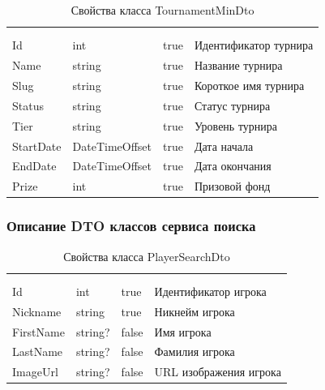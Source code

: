\begin{xltabular}{\textwidth}{|X|X|X|X|}
	\caption{Свойства класса TournamentMinDto}\label{table:TournamentMinDto}\\ \hline
	 &  &  &  \\ \hline
	 &  &  &  \\ \hline
	\endfirsthead
	 \hline
	 &  &  &  \\ \hline
	\endhead
	Id & int & true & Идентификатор турнира \\ \hline
	Name & string & true & Название турнира \\ \hline
	Slug & string & true & Короткое имя турнира \\ \hline
	Status & string & true & Статус турнира \\ \hline
	Tier & string & true & Уровень турнира \\ \hline
	StartDate & DateTimeOffset & true & Дата начала \\ \hline
	EndDate & DateTimeOffset & true & Дата окончания \\ \hline
	Prize & int & true & Призовой фонд \\ \hline
\end{xltabular}

\subsubsection{Описание DTO классов сервиса поиска}

\begin{xltabular}{\textwidth}{|X|X|X|X|}
	\caption{Свойства класса PlayerSearchDto}\label{table:PlayerSearchDto}\\ \hline
	 &  &  &  \\ \hline
	 &  &  &  \\ \hline
	\endfirsthead
	 \hline
	 &  &  &  \\ \hline
	\endhead
	Id & int & true & Идентификатор игрока \\ \hline
	Nickname & string & true & Никнейм игрока \\ \hline
	FirstName & string? & false & Имя игрока \\ \hline
	LastName & string? & false & Фамилия игрока \\ \hline
	ImageUrl & string? & false & URL изображения игрока \\ \hline
\end{xltabular}

